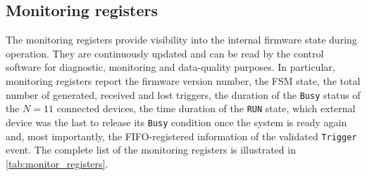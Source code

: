 \subsection{Monitoring registers}\label{ssec:monitor_registers}
The monitoring registers provide visibility into the internal firmware state during operation. They are continuously updated and can be read by the control software for diagnostic, monitoring and data-quality purposes. In particular, monitoring registers report the firmware version number, the FSM state, the total number of generated, received and lost triggers, the duration of the \texttt{Busy} status of the $N=11$ connected devices, the time duration of the \texttt{RUN} state, which external device was the last to release its \texttt{Busy} condition once the system is ready again and, most importantly, the FIFO-registered information of the validated \texttt{Trigger} event. The complete list of the monitoring registers is illustrated in \autoref{tab:monitor_registers}.

